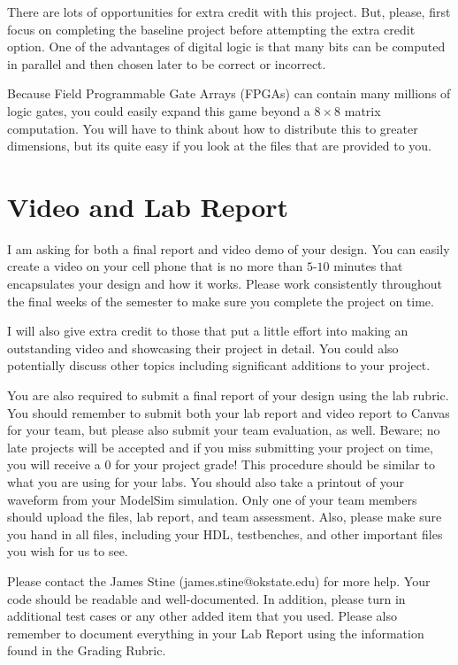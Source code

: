 \documentclass{article}
\begin{document}
There are lots of opportunities for extra credit with this project.
But, please, first focus on completing the baseline project before
attempting the extra credit option.  One of the advantages of digital
logic is that many bits can be computed in parallel and then chosen
later to be correct or incorrect.

Because Field Programmable Gate Arrays
(FPGAs) can contain many millions of logic gates, you could
easily expand this game beyond a $8 \times 8$ matrix computation.  You
will have to think about how to distribute this to greater dimensions,
but its quite easy if you look at the files that are provided to you.

\section{Video and Lab Report}

I am asking for
both a final report and video demo of your design.  You can easily
create a video on your cell phone that is no more than $5$-$10$ minutes
that encapsulates your design and how it works.  Please work
consistently throughout the final weeks of the semester to make sure
you complete the project on time.

I will also give extra credit to those that put a little effort into
making an outstanding video and showcasing their project in detail.
You could also potentially discuss other topics including significant
additions to your project.

You are also required to submit a final report of your design using
the lab rubric.  You should remember to submit both your lab report
and video report to Canvas for
your team, but please also submit your team evaluation, as well.
Beware; no
late projects will be accepted and if you miss submitting your project
on time, you will receive a $0$ for your project grade!  This
procedure should be similar to what you are using for your labs.
You should also take a printout of your waveform 
from your ModelSim simulation.  
Only one of your team members should upload
the files, lab report, and team assessment.  Also, please make sure you
hand in all files, including your HDL, testbenches, and other
important files you wish for us to see.

Please contact
the James Stine
(james.stine@okstate.edu) 
for more help.  Your
code should be
readable and well-documented. In addition, please turn in additional
test cases or any other added item that you used. 
Please also remember to document everything in your Lab Report using
the information found in the Grading Rubric.

   


\end{document}

